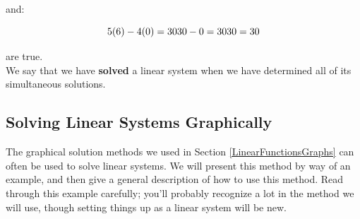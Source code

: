 and:

$$5(6) - 4(0) = 30\\30 - 0 = 30\\30 = 30$$

are true.\\

We say that we have \textbf{solved} a linear system when we have determined all of its simultaneous solutions.

\subsection{Solving Linear Systems Graphically}

The graphical solution methods we used in Section \ref{LinearFunctionsGraphs} can often be used to solve linear systems.  We will present this method by way of an example, and then give a general description of how to use this method. Read through this example carefully; you’ll probably recognize a lot in the method we will use, though setting things up as a linear system will be new.


